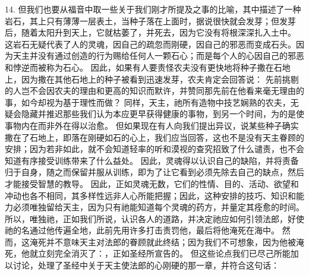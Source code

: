 14. 但我们也要从福音中取一些关于我们刚才所提及之事的比喻，其中描述了一种岩石，其上只有薄薄一层表土，当种子落在上面时，据说很快就会发芽；但发芽后，随着太阳升到天上，它就枯萎了，并死去，因为它没有将根深深扎入土中。\newline{} 这岩石无疑代表了人的灵魂，因自己的疏忽而刚硬，因自己的邪恶而变成石头。因为天主并没有通过创造的行为赐给任何人一颗石心；而是每个人的心因自己的邪恶和悖逆而被称为石心。\newline{} 因此，如果有人要责怪农夫没有更快地将种子撒在石地上，因为撒在其他石地上的种子被看到迅速发芽，农夫肯定会回答说：\newline{} 先前挑剔的人岂不会因农夫的理由和更高的知识而默许，并赞同那先前在他看来毫无理由的事，如今却视为基于理性而做？\newline{} 同样，天主，祂所有造物中技艺娴熟的农夫，无疑会隐藏并推迟那些我们认为本应更早获得健康的事物，到另一个时间，为的是使事物内在而非外在得以治愈。\newline{} 但如果现在有人向我们提出异议，说某些种子确实撒在了石地上，即落在刚硬如石的心上，我们应当回答，这也不是没有天主眷顾的安排；因为若非如此，就不会知道轻率的听和漠视的查究招致了什么谴责，也不会知道有序接受训练带来了什么益处。\newline{} 因此，灵魂得以认识自己的缺陷，并将责备归于自身，随之而保留并服从训练，即为了让它看到必须先除去自己的缺点，然后才能接受智慧的教导。\newline{} 因此，正如灵魂无数，它们的性情、目的、活动、欲望和冲动也各不相同，其多样性远非人心所能把握；因此，这种安排的技巧、知识和能力必须唯独留给天主，因为只有祂能知道每个灵魂的药方，并量定其痊愈的时间。\newline{} 所以，唯独祂，正如我们所说，认识各人的道路，并决定祂应如何引领法郎，好使祂的名通过他传遍全地，此前先用许多打击责罚他，最后将他淹死在海中。\newline{} 然而，这淹死并不意味天主对法郎的眷顾就此终结；因为我们不可想象，因为他被淹死，他就立刻完全消灭了：，正如圣经所宣告的。\newline{} 但这些论点我们已尽己所能加以讨论，处理了圣经中关于天主使法郎的心刚硬的那一章，并符合这句话：\par

